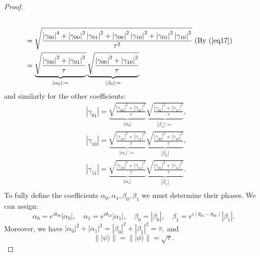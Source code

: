 \begin{example}
\begin{proof}
\begin{equation}
\begin{aligned}
{    } \\
    & =\sqrt{
    \frac{\left|\gamma_{00}\right|^4+\left|\gamma_{00}\right|^2\left|\gamma_{01}\right|^2+\left|\gamma_{00}\right|^2\left|\gamma_{10}\right|^2+\left|\gamma_{01}\right|^2\left|\gamma_{10}\right|^2}{\tau^2}
    }  \text{ (By (\ref{eq17}) } \\
    & =
    \underbrace{
    \sqrt{\frac{\left|\gamma_{00}\right|^2+\left|\gamma_{01}\right|^2}{\tau}}
    }_{\left|\alpha_0\right|:=} 
    \underbrace{
    \sqrt{\frac{\left|\gamma_{00}\right|^2+\left|\gamma_{10}\right|^2}{\tau}}
    }_{\left|\beta_0\right|:=} 
    \end{aligned}
\end{equation}
    and similarly for the other coefficients:
    \begin{equation}
    \begin{aligned}
    & \left|\gamma_{01}\right|
    =\underbrace{
    \sqrt{\frac{\left|\gamma_{00}\right|^2+\left|\gamma_{01}\right|^2}{\tau}}
    }_{\left|\alpha_0\right|}
    \underbrace{
    \sqrt{\frac{\left|\gamma_{01}\right|^2+\left|\gamma_{11}\right|^2}{\tau}}
    }_{\left|\beta_1\right|:=}, \\
    & \left|\gamma_{10}\right|
    =\underbrace{
    \sqrt{\frac{\left|\gamma_{10}\right|^2+\left|\gamma_{11}\right|^2}{\tau}}
    }_{\left|\alpha_1\right|:=}
    \underbrace{
    \sqrt{\frac{\left|\gamma_{00}\right|^2+\left|\gamma_{10}\right|^2}{\tau}}
    }_{\left|\beta_0\right|}, \\
    & \left|\gamma_{11}\right|
    =\underbrace{
    \sqrt{\frac{\left|\gamma_{10}\right|^2+\left|\gamma_{11}\right|^2}{\tau}}
    }_{\left|\alpha_1\right|}
    \underbrace{
    \sqrt{\frac{\left|\gamma_{01}\right|^2+\left|\gamma_{11}\right|^2}{\tau}}
    }_{\left|\beta_1\right|}. \\
    &
    \end{aligned}
\end{equation}
    To fully define the coefficients $\alpha_0, \alpha_1, \beta_0, \beta_1$ we must determine their phases. We can assign:
	\begin{equation}
    \alpha_0=e^{i \theta_{00}}\left|\alpha_0\right|, \quad \alpha_1=e^{i \theta_{10}}\left|\alpha_1\right|, \quad \beta_0=\left|\beta_0\right|, \quad \beta_1=e^{i\left(\theta_{01}-\theta_{00}\right)}\left|\beta_1\right| .
\end{equation}
    Moreover, we have 
    $
    \left|\alpha_0\right|^2+\left|\alpha_1\right|^2=\left|\beta_0\right|^2+\left|\beta_1\right|^2=\tau,
$
    and
    \begin{equation}
    \label{tau}
        \left\| | \psi\rangle \right\|  = \left\|  |\phi\rangle \right\|  = \sqrt{\tau}.
\end{equation}


\end{proof}
\end{example}

